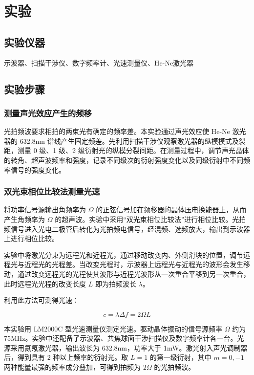 \documentclass[12pt,a4paper]{article}
\newcommand{\be}[1]{
    \begin{equation}
        #1
    \end{equation}
}
\begin{document}
\section{实验}
\subsection{实验仪器}

示波器、扫描干涉仪、数字频率计、光速测量仪、He-Ne激光器

\subsection{实验步骤}

\subsubsection{测量声光效应产生的频移}

光拍频波要求相拍的两束光有确定的频率差。本实验通过声光效应使 He-Ne 激光器的 632.8nm 谱线产生固定频差。先利用扫描干涉仪观察激光器的纵模模式及裂距，测量 0 级、1 级、2 级衍射光的纵模分裂间距。在测量过程中，调节声光晶体的转角、超声波频率和强度，记录不同级次的衍射强度变化以及同级衍射中不同频率信号的强度变化。

\subsubsection{双光束相位比较法测量光速}

将功率信号源输出角频率为 $\Omega$ 的正弦信号加在频移器的晶体压电换能器上，从而产生角频率为 $\Omega$ 的超声波。实验中采用“双光束相位比较法”进行相位比较。光拍频信号进入光电二极管后转化为光拍频电信号，经混频、选频放大，输出到示波器上进行相位比较。

实验中将激光分束为远程光和近程光，通过移动改变内、外侧滑块的位置，调节远程光与近程光的光程差。当改变光程时，示波器上远程光与近程光的波形会发生移动，通过改变远程光的光程使其波形与近程光波形从一次重合平移到另一次重合，此时远程光光程的改变长度 $L$ 即为拍频波长 $\lambda$。

利用此方法可测得光速：


\be{c = \lambda \Delta f = 2\Omega L}


本实验用 LM2000C 型光速测量仪测定光速。驱动晶体振动的信号源频率 $\Omega$ 约为 75MHz。实验中还配备了示波器、共焦球面干涉扫描仪及数字频率计各一台。光源采用氦氖激光器，输出波长为 632.8nm，功率大于 1mW。激光射入声光调制器后，得到具有 2 种以上频率的衍射光。取 $L=1$ 的第一级衍射，其中 $m=0, -1$ 两种能量最强的频率成分叠加，可得到拍频为 $2\Omega$ 的光拍频波。
\end{document}
